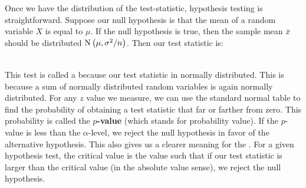 \begin{comment}{
temp = {};
For[n = 100, n <= 1000, n = n + 10,
 temp = AppendTo[
   temp, {n, 1 - Sum[Binomial[n, i], {i, .45 n, .55 n}]/2^n}]]
ListPlot[temp, AxesLabel -> {"Number of flips", "Probability"},
 PlotRange -> {{100, 1000}, {0, .3}},
 PlotLabel -> "Probability of getting an unusual result"]
}\end{comment}

Once we have the distribution of the test-statistic, hypothesis testing is straightforward.  Suppose our null hypothesis is that the mean of a random variable $X$ is equal to $\mu$.  If the null hypothesis is true, then the sample mean $\bar{x}$ should be distributed ${\rm N}\left(\mu,\sigma^2/n\right)$.  Then our test statistic is:


\ \\

This test is called a  because our test statistic in normally distributed. This is because a sum of normally distributed random variables is again normally distributed. For any $z$ value we measure, we can use the standard normal table to find the probability of obtaining a test statistic that far or farther from zero.  This probability is called the \textbf{$p$-value}  (which stands for probability value). If the $p$-value is less than the $\alpha$-level, we reject the null hypothesis in favor of the alternative hypothesis.  This also gives us a clearer meaning for the .  For a given hypothesis test, the critical value is the value such that if our test statistic is larger than the critical value (in the absolute value sense), we reject the null hypothesis.

